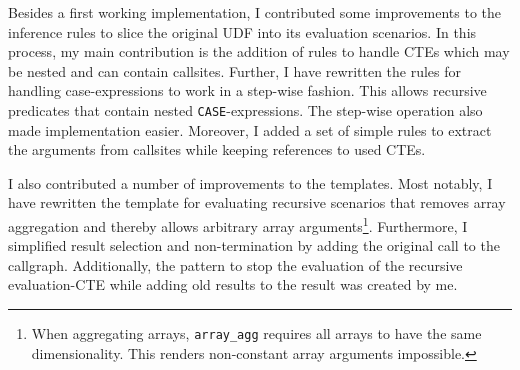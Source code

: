 Besides a first working implementation, I contributed some improvements to the inference rules to slice the original UDF into its evaluation scenarios. In this process, my main contribution is the addition of rules to handle CTEs which may be nested and can contain callsites. Further, I have rewritten the rules for handling case-expressions to work in a step-wise fashion. This allows recursive predicates that contain nested \texttt{CASE}-expressions. The step-wise operation also made implementation easier. Moreover, I added a set of simple rules to extract the arguments from callsites while keeping references to used CTEs.

I also contributed a number of improvements to the templates. Most notably, I have rewritten the template for evaluating recursive scenarios that removes array aggregation and thereby allows arbitrary array arguments\footnote{When aggregating arrays, \texttt{array\_agg} requires all arrays to have the same dimensionality. This renders non-constant array arguments impossible.}. Furthermore, I simplified result selection and non-termination by adding the original call to the callgraph. Additionally, the pattern to stop the evaluation of the recursive evaluation-CTE while adding old results to the result was created by me.


